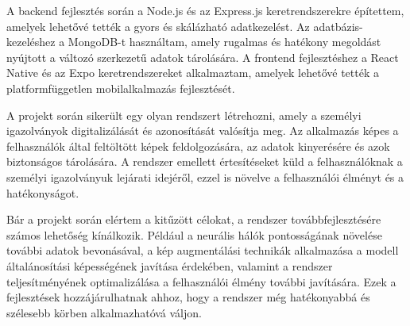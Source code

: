 \documentclass[
]{thesis-ekf}
\theoremstyle{definition}
\theoremstyle{remark}
\begin{document}
A backend fejlesztés során a Node.js és az Express.js keretrendszerekre építettem, amelyek lehetővé tették a gyors és skálázható adatkezelést. Az adatbázis-kezeléshez a MongoDB-t használtam, amely rugalmas és hatékony megoldást nyújtott a változó szerkezetű adatok tárolására. A frontend fejlesztéshez a React Native és az Expo keretrendszereket alkalmaztam, amelyek lehetővé tették a platformfüggetlen mobilalkalmazás fejlesztését.

A projekt során sikerült egy olyan rendszert létrehozni, amely a személyi igazolványok digitalizálását és azonosítását valósítja meg. Az alkalmazás képes a felhasználók által feltöltött képek feldolgozására, az adatok kinyerésére és azok biztonságos tárolására. A rendszer emellett értesítéseket küld a felhasználóknak a személyi igazolványuk lejárati idejéről, ezzel is növelve a felhasználói élményt és a hatékonyságot.

Bár a projekt során elértem a kitűzött célokat, a rendszer továbbfejlesztésére számos lehetőség kínálkozik. Például a neurális hálók pontosságának növelése további adatok bevonásával, a kép augmentálási technikák alkalmazása a modell általánosítási képességének javítása érdekében, valamint a rendszer teljesítményének optimalizálása a felhasználói élmény további javítására. Ezek a fejlesztések hozzájárulhatnak ahhoz, hogy a rendszer még hatékonyabbá és szélesebb körben alkalmazhatóvá váljon.
\end{document}
